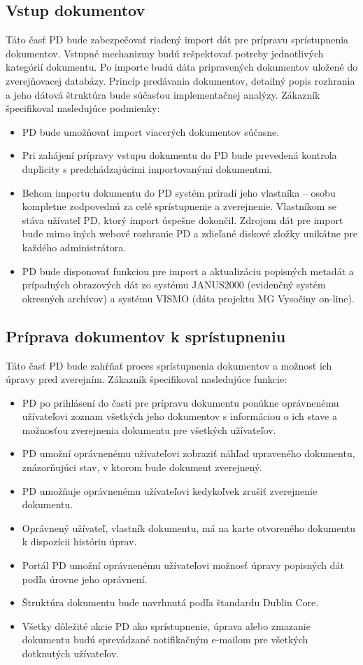 \documentclass[
  print, %
  table,   %
  lof,     %
  nolot,     %
]{fithesis3}
\begin{document}
\subsection{Vstup dokumentov} 
Táto časť PD bude zabezpečovať riadený import dát pre prípravu sprístupnenia dokumentov. Vstupné mechanizmy budú rešpektovať potreby jednotlivých kategórií dokumentu. Po importe budú dáta pripravených dokumentov uložené do zverejňovacej databázy. Princíp predávania dokumentov, detailný popis rozhrania a jeho dátová štruktúra bude súčasťou implementačnej analýzy. Zákazník špecifikoval nasledujúce podmienky:
\begin{itemize}
	\item PD bude umožňovať import viacerých dokumentov súčasne.
	\item Pri zahájení prípravy vstupu dokumentu do PD bude prevedená kontrola duplicity s predchádzajúcimi importovanými dokumentmi.
	\item Behom importu dokumentu do PD systém priradí jeho vlastníka – osobu kompletne zodpovednú za celé sprístupnenie a zverejnenie. Vlastníkom se stáva užívateľ PD, ktorý import úspešne dokončil. Zdrojom dát pre import bude mimo iných webové rozhranie PD a zdieľané diskové zložky unikátne pre každého administrátora.
	\item PD bude disponovať funkciou pre import a aktualizáciu popisných metadát a prípadných obrazových dát zo systému JANUS2000 (evidenčný systém okresných archívov) a systému VISMO (dáta projektu MG Vysočiny on-line).
\end{itemize}
\subsection{Príprava dokumentov k sprístupneniu}
Táto časť PD bude zahŕňať proces sprístupnenia dokumentov a možnosť ich úpravy pred zverejním. Zákazník špecifikoval nasledujúce funkcie:
\begin{itemize}
	\item PD po prihlásení do časti pre prípravu dokumentu ponúkne oprávnenému užívateľovi zoznam všetkých jeho dokumentov s informáciou o ich stave a možnosťou zverejnenia dokumentu pre všetkých užívateľov.
	\item PD umožní oprávnenému užívateľovi zobraziť náhľad upraveného dokumentu, znázorňujúci stav, v ktorom bude dokument zverejnený.
	\item PD umožňuje oprávnenému užívateľovi kedykoľvek zrušiť zverejnenie dokumentu. 
	\item Oprávnený užívateľ, vlastník dokumentu, má na karte otvoreného dokumentu k dispozícii históriu úprav.
	\item Portál PD umožní oprávnenému užívateľovi možnosť úpravy popisných dát podľa úrovne jeho oprávnení.
	\item Štruktúra dokumentu bude navrhnutá podľa štandardu Dublin Core.
	\item Všetky dôležité akcie PD ako sprístupnenie, úprava alebo zmazanie dokumentu budú sprevádzané notifikačným e-mailom pre všetkých dotknutých užívateľov.
\end{itemize}
\end{document}
